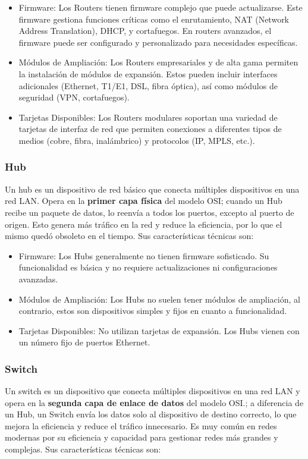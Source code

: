 \documentclass{article}
\begin{document}
\begin{itemize}
    \item Firmware: Los Routers tienen firmware complejo que puede actualizarse. Este firmware gestiona funciones críticas como el enrutamiento, NAT (Network Address Translation), DHCP, y cortafuegos. En routers avanzados, el firmware puede ser configurado y personalizado para necesidades específicas.
    \item Módulos de Ampliación: Los Routers empresariales y de alta gama permiten la instalación de módulos de expansión. Estos pueden incluir interfaces adicionales (Ethernet, T1/E1, DSL, fibra óptica), así como módulos de seguridad (VPN, cortafuegos).
    \item Tarjetas Disponibles: Los Routers modulares soportan una variedad de tarjetas de interfaz de red que permiten conexiones a diferentes tipos de medios (cobre, fibra, inalámbrico) y protocolos (IP, MPLS, etc.).
\end{itemize}


\subsubsection{Hub}
Un hub es un dispositivo de red básico que conecta múltiples dispositivos en una red LAN. Opera en la \textbf{primer capa física} del modelo OSI; cuando un Hub recibe un paquete de datos, lo reenvía a todos los puertos, excepto al puerto de origen. Esto genera más tráfico en la red y reduce la eficiencia, por lo que el mismo quedó obsoleto en el tiempo. Sus características técnicas son:

\begin{itemize}
    \item Firmware: Los Hubs generalmente no tienen firmware sofisticado. Su funcionalidad es básica y no requiere actualizaciones ni configuraciones avanzadas.
    \item Módulos de Ampliación: Los Hubs no suelen tener módulos de ampliación, al contrario, estos son dispositivos simples y fijos en cuanto a funcionalidad.
    \item Tarjetas Disponibles: No utilizan tarjetas de expansión. Los Hubs vienen con un número fijo de puertos Ethernet.
\end{itemize}


\subsubsection{Switch}
Un switch es un dispositivo que conecta múltiples dispositivos en una red LAN y opera en la \textbf{segunda capa de enlace de datos} del modelo OSI.; a diferencia de un Hub, un Switch envía los datos solo al dispositivo de destino correcto, lo que mejora la eficiencia y reduce el tráfico innecesario. Es muy común en redes modernas por su eficiencia y capacidad para gestionar redes más grandes y complejas. Sus características técnicas son:
\end{document}
